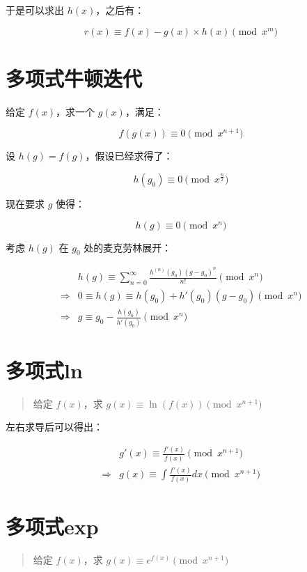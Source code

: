 \documentclass[UTF8]{article}
\begin{document}
于是可以求出 $h(x)$，之后有：

$$
r(x) \equiv f(x)-g(x) \times h(x) \pmod {x^{m}}
$$

\section{多项式牛顿迭代}

    给定 $f(x)$，求一个 $g(x)$，满足：
    
    $$
    f(g(x)) \equiv 0 \pmod {x^{n+1}}
    $$

设 $h(g)=f(g)$，假设已经求得了：

$$
h(g_0) \equiv 0 \pmod {x^{\frac{n}{2}}}
$$

现在要求 $g$ 使得：

$$
h(g) \equiv 0 \pmod {x^{n}}
$$

考虑 $h(g)$ 在 $g_0$ 处的麦克劳林展开：

$$
\begin{aligned}
&h(g) \equiv \sum_{n = 0}^{\infty} \frac{h^{(n)}(g_0)(g-g_0)^n}{n!} \pmod {x^{n}} \\
\Rightarrow
&0 \equiv h(g) \equiv h(g_0)+h'(g_0)(g-g_0) \pmod {x^{n}} \\
\Rightarrow
&g \equiv g_0-\frac{h(g_0)}{h'(g_0)} \pmod {x^{n}}
\end{aligned}
$$

\section{多项式ln}

\begin{quotation}
    给定 $f(x)$，求 $g(x) \equiv \ln(f(x)) \pmod {x^{n+1}}$
\end{quotation}

左右求导后可以得出：

$$
\begin{aligned}
& g'(x) \equiv \frac{f'(x)}{f(x)} \pmod {x^{n+1}} \\
\Rightarrow 
& g(x) \equiv \int \frac{f'(x)}{f(x)}dx \pmod {x^{n+1}}
\end{aligned}
$$

\section{多项式exp}

\begin{quotation}
    给定 $f(x)$，求 $g(x) \equiv e^{f(x)} \pmod {x^{n+1}}$
\end{quotation}
\end{document}
